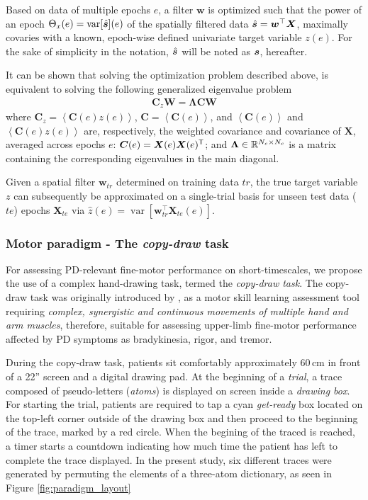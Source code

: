 \documentclass[10pt,a4paper]{article}
\providecommand{\mat}[1]{{\bm {#1}}}
\begin{document}
Based on data of multiple epochs $e$, a filter $\mat{w}$ is optimized such that the power of an epoch $\Theta_x(e) = \operatorname{var}[\hat{{\bm {s}}}](e)$ of the spatially filtered data $\hat{\ve{s}}=\mat{w}^\top\mat{X}$, maximally covaries with a known, epoch-wise defined univariate target variable $z(e)$. For the sake of simplicity in the notation, $\hat{{\bm {s}}}$ will be noted as ${\bm {s}}$, hereafter.
 
It can be shown that solving the optimization problem described above, is equivalent to solving the following generalized eigenvalue problem
\begin{align}\label{eq:eig_spoc}
\mat{C}_z\mat{W} = \mat{\Lambda}\mat{C}\mat{W}
\end{align}
where $\mat{C}_z = \left<\mat{C}(e)z(e)\right>$, $\mat{C} = \left<\mat{C}(e)\right>$, and $\left<\mat{C}(e)\right>$ and $\left<\mat{C}(e)z(e)\right>$ are, respectively, the weighted covariance and covariance of $\mat{X}$, averaged across epochs $e$: $\mat{C}(e) = \mat{X}(e)\mat{X}(e)^\T$; and $\mat{\Lambda} \in \Real^{N_c\times N_c}$ is a matrix containing the corresponding eigenvalues in the main diagonal.

Given a spatial filter $\mat{w}_{tr}$ determined on training data $tr$, the true target variable $z$ can subsequently be approximated on a single-trial basis for unseen test data ($te$) epochs $\mat{X}_{te}$ via $\hat{z}(e) = \operatorname{var}[\mat{w}_{tr}^\top\mat{X}_{te}(e)]$. 

\subsubsection{Motor paradigm - The \textit{copy-draw} task}
For assessing PD-relevant fine-motor performance on short-timescales, we propose the use of a complex hand-drawing task, termed the \textit{copy-draw task}. The copy-draw task was originally introduced by \cite{prichard2014effects}, as a motor skill learning assessment tool requiring \textit{complex, synergistic and continuous movements of multiple hand and arm muscles}, therefore, suitable for assessing upper-limb fine-motor performance affected by PD symptoms as bradykinesia, rigor, and tremor.

During the copy-draw task, patients sit comfortably approximately 60\,cm in front of a 22'' screen and a digital drawing pad. At the beginning of a \textit{trial}, a trace composed of pseudo-letters (\textit{atoms}) is displayed on screen inside a \textit{drawing box}. For starting the trial, patients are required to tap a cyan \textit{get-ready} box located on the top-left corner outside of the drawing box and then proceed to the beginning of the trace, marked by a red circle. When the begining of the traced is reached, a timer starts a countdown indicating how much time the patient has left to complete the trace displayed. In the present study, six different traces were generated by permuting the elements of a three-atom dictionary, as seen in Figure \ref{fig:paradigm_layout}
\end{document}
